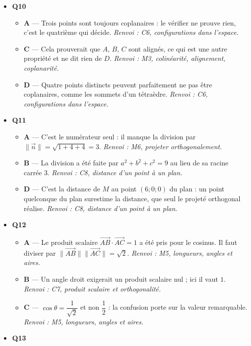 \begin{itemize}
\begin{itemize}
  \end{itemize}
  \item \textbf{Q10}
  \begin{itemize}
    \item \textbf{A} — Trois points sont toujours coplanaires : le vérifier ne prouve rien, c'est le quatrième qui décide. \emph{Renvoi : C6, configurations dans l'espace.}
    \item \textbf{C} — Cela prouverait que $A$, $B$, $C$ sont alignés, ce qui est une autre propriété et ne dit rien de $D$. \emph{Renvoi : M3, colinéarité, alignement, coplanarité.}
    \item \textbf{D} — Quatre points distincts peuvent parfaitement ne pas être coplanaires, comme les sommets d'un tétraèdre. \emph{Renvoi : C6, configurations dans l'espace.}
  \end{itemize}
  \item \textbf{Q11}
  \begin{itemize}
    \item \textbf{A} — C'est le numérateur seul : il manque la division par $\lVert\vec{n}\rVert=\sqrt{1+4+4}=3$. \emph{Renvoi : M6, projeter orthogonalement.}
    \item \textbf{B} — La division a été faite par $a^2+b^2+c^2=9$ au lieu de sa racine carrée $3$. \emph{Renvoi : C8, distance d'un point à un plan.}
    \item \textbf{D} — C'est la distance de $M$ au point $(6;0;0)$ du plan : un point quelconque du plan surestime la distance, que seul le projeté orthogonal réalise. \emph{Renvoi : C8, distance d'un point à un plan.}
  \end{itemize}
  \item \textbf{Q12}
  \begin{itemize}
    \item \textbf{A} — Le produit scalaire $\vec{AB}\cdot\vec{AC}=1$ a été pris pour le cosinus. Il faut diviser par $\lVert\vec{AB}\rVert\lVert\vec{AC}\rVert=\sqrt{2}$. \emph{Renvoi : M5, longueurs, angles et aires.}
    \item \textbf{B} — Un angle droit exigerait un produit scalaire nul ; ici il vaut $1$. \emph{Renvoi : C7, produit scalaire et orthogonalité.}
    \item \textbf{C} — $\cos\theta=\dfrac{1}{\sqrt2}$ et non $\dfrac12$ : la confusion porte sur la valeur remarquable. \emph{Renvoi : M5, longueurs, angles et aires.}
  \end{itemize}
  \item \textbf{Q13}
  \begin{itemize}

\end{itemize}
\end{itemize}
